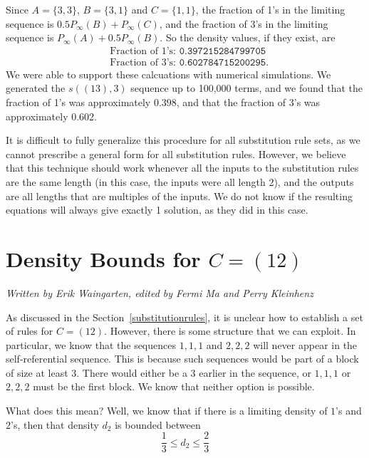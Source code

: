 \documentclass[runningheads,a4paper]{llncs}
\begin{document}
Since $A = \{3,3\}$, $B = \{3,1\}$ and $C = \{1,1\}$, the fraction of 1's in the limiting sequence is $0.5P_{\infty}(B) + P_{\infty}(C)$, and the fraction of 3's in the limiting sequence is $P_{\infty}(A) + 0.5P_{\infty}(B)$. So the density values, if they exist, are
\begin{align*}
&\text{Fraction of 1's: }\texttt{0.397215284799705}\\
&\text{Fraction of 3's: }\texttt{0.602784715200295}.
\end{align*}
We were able to support these calcuations with numerical simulations. We generated the $s((13),3)$ sequence up to 100,000 terms, and we found that the fraction of 1's was approximately $0.398$, and that the fraction of 3's was approximately 0.602.

It is difficult to fully generalize this procedure for all substitution rule sets, as we cannot prescribe a general form for all substitution rules. However, we believe that this technique should work whenever all the inputs to the substitution rules are the same length (in this case, the inputs were all length 2), and the outputs are all lengths that are multiples of the inputs. We do not know if the resulting equations will always give exactly 1 solution, as they did in this case.

\section{Density Bounds for $C = (12)$}
\label{densitybounds}
\emph{Written by Erik Waingarten, edited by Fermi Ma and Perry Kleinhenz}

As discussed in the Section~\ref{substitutionrules}, it is unclear how to establish a set of rules for $C = (1 2)$. However, there is some structure that we can exploit. In particular, we know that the sequences $1, 1, 1$ and $2, 2, 2$ will never appear in the self-referential sequence. This is because such sequences would be part of a block of size at least $3$. There would either be a 3 earlier in the sequence, or $1,1,1$ or $2,2,2$ must be the first block. We know that neither option is possible.

What does this mean? Well, we know that if there is a limiting density of $1$'s and $2$'s, then that density $d_2$ is bounded between 
\[ \dfrac{1}{3} \leq d_2 \leq \dfrac{2}{3} \]
\end{document}
